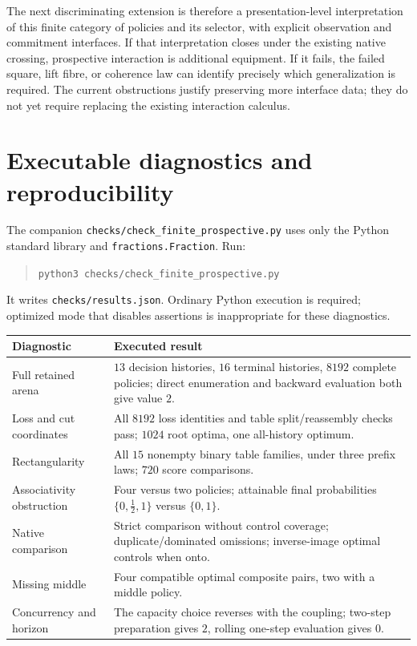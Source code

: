 \documentclass[11pt]{article}
\theoremstyle{definition}
\begin{document}
The next discriminating extension is therefore a presentation-level
interpretation of this finite category of policies and its selector,
with explicit observation and commitment interfaces. If that
interpretation closes under the existing native crossing, prospective
interaction is additional equipment. If it fails, the failed square,
lift fibre, or coherence law can identify precisely which generalization
is required. The current obstructions justify preserving more interface
data; they do not yet require replacing the existing interaction calculus.

\appendix
\section{Executable diagnostics and reproducibility}
\label{sec:checks}
The companion \texttt{checks/check\_finite\_prospective.py} uses only the
Python standard library and \texttt{fractions.Fraction}. Run:
\begin{quote}
\texttt{python3 checks/check\_finite\_prospective.py}
\end{quote}
It writes \texttt{checks/results.json}. Ordinary Python execution is
required; optimized mode that disables assertions is inappropriate for
these diagnostics.

\begin{center}
\small
\begin{tabularx}{\textwidth}{@{}lX@{}}
\toprule
Diagnostic & Executed result\\
\midrule
Full retained arena & \(13\) decision histories, \(16\) terminal histories,
\(8192\) complete policies; direct enumeration and backward evaluation
both give value \(2\).\\
Loss and cut coordinates & All \(8192\) loss identities and table
split/reassembly checks pass; \(1024\) root optima, one all-history optimum.\\
Rectangularity & All \(15\) nonempty binary table families, under three
prefix laws; \(720\) score comparisons.\\
Associativity obstruction & Four versus two policies; attainable final
probabilities \(\{0,\tfrac12,1\}\) versus \(\{0,1\}\).\\
Native comparison & Strict comparison without control coverage;
duplicate/dominated omissions; inverse-image optimal controls when onto.\\
Missing middle & Four compatible optimal composite pairs, two with a
middle policy.\\
Concurrency and horizon & The capacity choice reverses with the coupling;
two-step preparation gives \(2\), rolling one-step evaluation gives \(0\).\\
\bottomrule
\end{tabularx}
\end{center}
\end{document}

